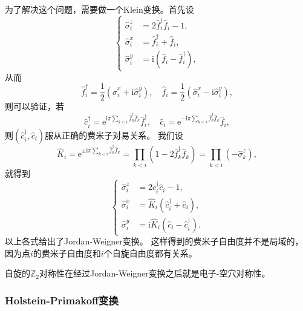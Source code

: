 \documentclass[hyperref, UTF8, a4paper]{ctexart}
\newcommand*{\ii}{\mathrm{i}}
\newcommand*{\ee}{\mathrm{e}}
\begin{document}
为了解决这个问题，需要做一个Klein变换。首先设
\begin{equation}
    \left\{
        \begin{aligned}
            \hat{\sigma}^z_i &= 2 \hat{f}^\dagger_i \hat{f}_i - 1, \\
            \hat{\sigma}^x_i &= \hat{f}^\dagger_i + \hat{f}_i, \\
            \hat{\sigma}^y_i &= \ii (\hat{f}_i - \hat{f}^\dagger_i),
        \end{aligned}
    \right.
\end{equation}
从而
\begin{equation}
    \hat{f}_i^\dagger = \frac{1}{2} (\hat{\sigma}^x_i + \ii \hat{\sigma}^y_i), \quad \hat{f}_i = \frac{1}{2} (\hat{\sigma}^x_i - \ii \hat{\sigma}^y_i),
\end{equation}
则可以验证，若
\begin{equation}
    \hat{c}^\dagger_i = \ee^{\ii \pi \sum_{k < i} \hat{f}_k^\dagger \hat{f}_k} \hat{f}^\dagger_i, \quad \hat{c}_i = \ee^{- \ii \pi \sum_{k < i} \hat{f}_k^\dagger \hat{f}_k} \hat{f}_i,
\end{equation}
则$(\hat{c}^\dagger_i, \hat{c}_i)$服从正确的费米子对易关系。
我们设
\begin{equation}
    \hat{K}_i = \ee^{\pm \ii \pi \sum_{k < i} \hat{f}_k^\dagger \hat{f}_k} = \prod_{k < i} (1 - 2 \hat{f}^\dagger_k \hat{f}_k) = \prod_{k < i} (- \hat{\sigma}_k^z),
\end{equation}
就得到
\begin{equation}
    \left\{
        \begin{aligned}
            \hat{\sigma}^z_i &= 2 \hat{c}^\dagger_i \hat{c}_i - 1, \\
            \hat{\sigma}^x_i &= \hat{K}_i (\hat{c}^\dagger_i + \hat{c}_i), \\
            \hat{\sigma}^y_i &= \ii \hat{K}_i (\hat{c}_i - \hat{c}^\dagger_i).
        \end{aligned}
    \right.
\end{equation}
以上各式给出了Jordan-Weigner变换。
这样得到的费米子自由度并不是局域的，因为点$i$的费米子自由度和$i$个自旋自由度都有关系。

自旋的$\mathbb{Z}_2$对称性在经过Jordan-Weigner变换之后就是电子-空穴对称性。

\subsubsection{Holstein-Primakoff变换}
\end{document}
